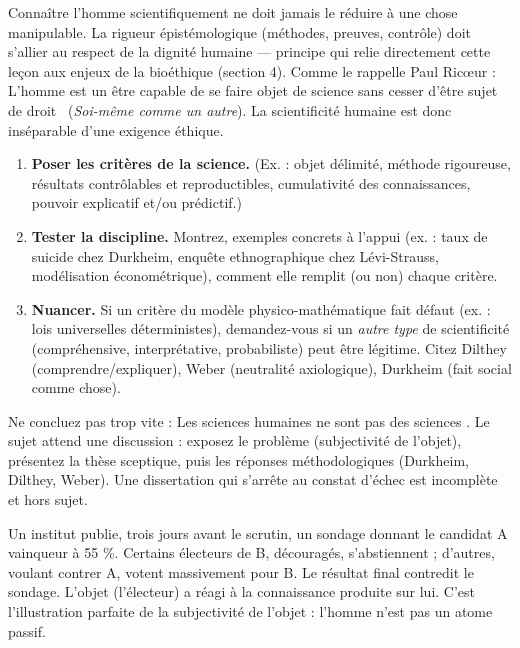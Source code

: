 \documentclass[11pt]{article}
\newcommand{\cle}[1]{{\popxbold\color{popdark}#1}}
\newcounter{popsec}
\newcounter{popsub}
\newcommand{\courssub}[1]{%
  \stepcounter{popsub}%
  \par\vspace{9pt}\noindent{\popxbold\fontsize{11.5}{13}\selectfont\color{popink}{\color{poporange}\thepopsec.\thepopsub}\hspace{6pt}#1}\par\nopagebreak\vspace{4pt}
}
\begin{document}
\courssub{Ouverture humaniste : science et dignité}

Connaître l'homme scientifiquement ne doit jamais le réduire à une \cle{chose} manipulable. La rigueur épistémologique (méthodes, preuves, contrôle) doit s'allier au respect de la \cle{dignité humaine} — principe qui relie directement cette leçon aux enjeux de la \cle{bioéthique} (section 4). Comme le rappelle Paul Ricœur : \guillemotleft L'homme est un être capable de se faire objet de science sans cesser d'être sujet de droit \guillemotright\ (\emph{Soi-même comme un autre}). La scientificité humaine est donc inséparable d'une exigence éthique.

\begin{methode}
\begin{enumerate}
    \item \textbf{Poser les critères de la science.} (Ex. : objet délimité, méthode rigoureuse, résultats contrôlables et reproductibles, cumulativité des connaissances, pouvoir explicatif et/ou prédictif.)
    \item \textbf{Tester la discipline.} Montrez, exemples concrets à l'appui (ex. : taux de suicide chez Durkheim, enquête ethnographique chez Lévi-Strauss, modélisation économétrique), comment elle remplit (ou non) chaque critère.
    \item \textbf{Nuancer.} Si un critère du modèle physico-mathématique fait défaut (ex. : lois universelles déterministes), demandez-vous si un \emph{autre type} de scientificité (compréhensive, interprétative, probabiliste) peut être légitime. Citez Dilthey (comprendre/expliquer), Weber (neutralité axiologique), Durkheim (fait social comme chose).
\end{enumerate}
\end{methode}

\begin{attention}
Ne concluez pas trop vite : \guillemotleft Les sciences humaines ne sont pas des sciences \guillemotright. Le sujet attend une \cle{discussion} : exposez le problème (subjectivité de l'objet), présentez la thèse sceptique, puis les réponses méthodologiques (Durkheim, Dilthey, Weber). Une dissertation qui s'arrête au constat d'échec est incomplète et hors sujet.
\end{attention}

\begin{exemplebox}
Un institut publie, trois jours avant le scrutin, un sondage donnant le candidat A vainqueur à 55 \%. Certains électeurs de B, découragés, s'abstiennent ; d'autres, voulant contrer A, votent massivement pour B. Le résultat final contredit le sondage. L'objet (l'électeur) a réagi à la connaissance produite sur lui. C'est l'illustration parfaite de la \cle{subjectivité de l'objet} : l'homme n'est pas un atome passif.
\end{exemplebox}
\end{document}
